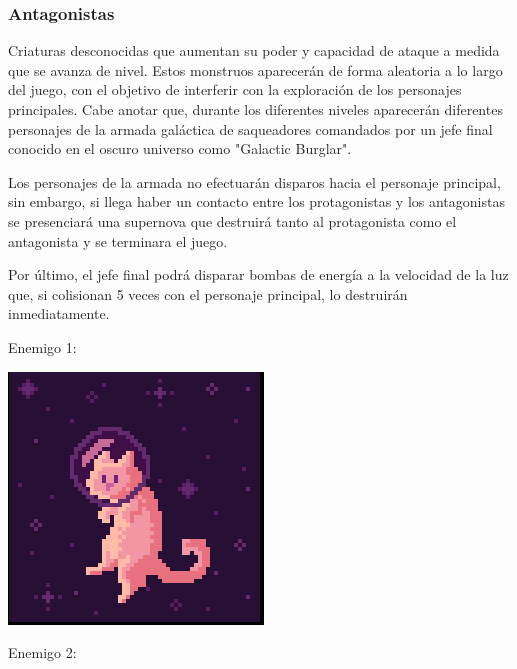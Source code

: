 \documentclass{article}
\begin{document}
\subsubsection{Antagonistas}
Criaturas desconocidas que aumentan su poder y capacidad de ataque a medida que se avanza de nivel. Estos monstruos aparecerán de forma aleatoria a lo largo del juego, con el objetivo de interferir con la exploración de los personajes principales. Cabe anotar que, durante los diferentes niveles aparecerán diferentes personajes de la armada galáctica de saqueadores comandados por un jefe final conocido en el oscuro universo como "Galactic Burglar". 

Los personajes de la armada no efectuarán disparos hacia el personaje principal, sin embargo, si llega haber un contacto entre los protagonistas y los antagonistas se presenciará una supernova que destruirá tanto al protagonista como el antagonista y se terminara el juego. 

Por último, el jefe final podrá disparar bombas de energía a la velocidad de la luz que, si colisionan 5 veces con el personaje principal, lo destruirán inmediatamente. 

Enemigo 1: 


\includegraphics[scale=0.55]{Ideación/Images/enemigo.png}

Enemigo 2:
\end{document}
